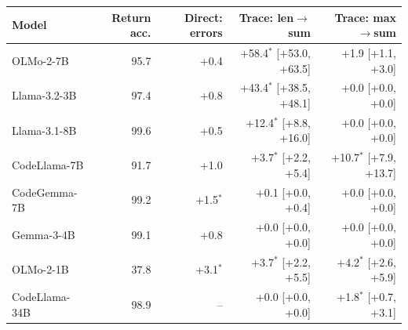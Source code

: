 \begin{tabular}{@{}lrrrr@{}}
\toprule
Model & Return acc. & Direct: errors & Trace: len$\to$sum & Trace: max$\to$sum \\
\midrule
OLMo-2-7B & 95.7 & +0.4 & +58.4$^{*}$ [+53.0, +63.5] & +1.9 [+1.1, +3.0] \\
Llama-3.2-3B & 97.4 & +0.8 & +43.4$^{*}$ [+38.5, +48.1] & +0.0 [+0.0, +0.0] \\
Llama-3.1-8B & 99.6 & +0.5 & +12.4$^{*}$ [+8.8, +16.0] & +0.0 [+0.0, +0.0] \\
CodeLlama-7B & 91.7 & +1.0 & +3.7$^{*}$ [+2.2, +5.4] & +10.7$^{*}$ [+7.9, +13.7] \\
CodeGemma-7B & 99.2 & +1.5$^{*}$ & +0.1 [+0.0, +0.4] & +0.0 [+0.0, +0.0] \\
Gemma-3-4B & 99.1 & +0.8 & +0.0 [+0.0, +0.0] & +0.0 [+0.0, +0.0] \\
OLMo-2-1B & 37.8 & +3.1$^{*}$ & +3.7$^{*}$ [+2.2, +5.5] & +4.2$^{*}$ [+2.6, +5.9] \\
CodeLlama-34B & 98.9 & -- & +0.0 [+0.0, +0.0] & +1.8$^{*}$ [+0.7, +3.1] \\
\bottomrule
\end{tabular}
